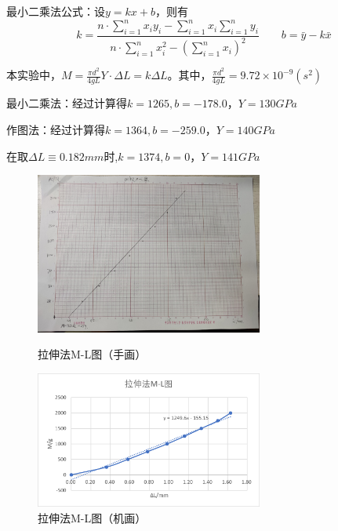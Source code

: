 \documentclass[11pt]{article}
\begin{document}
最小二乘法公式：设$y=kx+b$，则有
\begin{equation}
    k=\frac{n\cdot \sum\limits_{i = 1}^{n}x_i y_i - \sum\limits_{i = 1}^{n}x_i  \sum\limits_{i = 1}^{n}y_i  }{n\cdot \sum\limits_{i = 1}^{n}x_i^2-{\left(\sum\limits_{i = 1}^{n}x_i\right)}^2} 
    \qquad b=\bar{y}-k\bar{x}
\end{equation}
\par \hspace*{2em} 本实验中，$M=\frac{\pi d^2 }{4gL}Y\cdot \Delta L=k\Delta L$。其中，$\frac{\pi d^2 }{4gL}=9.72\times 10^{-9} (s^2)$
\par \hspace*{2em} 最小二乘法：经过计算得$k=1265,b=-178.0$，$Y=130GPa$
\par \hspace*{2em} 作图法：经过计算得$k=1364,b=-259.0$，$Y=140GPa$
\par \hspace*{2em} 在取$\Delta L\equiv 0.182mm$时,$k=1374,b=0$，$Y=141GPa$
\begin{figure}[H]
    \centering
    \begin{minipage}[t]{0.49\linewidth}
        \centering
        \includegraphics[width=7.5cm]{Fig/3.jpg}
        \caption{拉伸法M-L图（手画）}
        \label{fig:3}
    \end{minipage}
    \begin{minipage}[t]{0.49\linewidth}
        \centering
        \includegraphics[width=7.5cm]{Fig/4.png}
        \caption{拉伸法M-L图（机画）}
        \label{fig:4}
    \end{minipage}
\end{figure}
\end{document}
